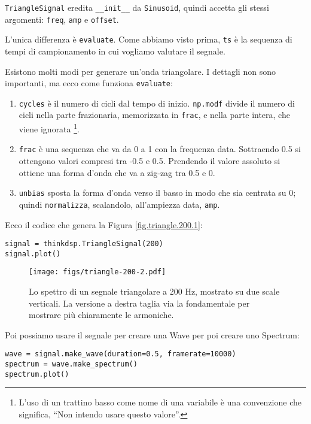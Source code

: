 \documentclass[12pt]{book} \usepackage[width=5.5in,height=8.5in, hmarginratio=3:2,vmarginratio=1:1]{geometry}
\begin{document}
{\tt TriangleSignal} eredita \verb"__init__" da {\tt Sinusoid}, quindi accetta gli stessi argomenti: {\tt freq}, {\tt amp} e {\tt offset}.

L'unica differenza è {\tt evaluate}. Come abbiamo visto prima, {\tt ts} è la sequenza di tempi di campionamento in cui vogliamo valutare il segnale.

Esistono molti modi per generare un'onda triangolare. I dettagli non sono importanti, ma ecco come funziona {\tt evaluate}:

\begin{enumerate} 

\item {\tt cycles} è il numero di cicli dal tempo di inizio. {\tt np.modf} divide il numero di cicli nella parte frazionaria, memorizzata in {\tt frac}, e nella parte intera, che viene ignorata \footnote{L'uso di un trattino basso come nome di una variabile è una convenzione che significa, ``Non intendo usare questo valore''.}.

\item {\tt frac} è una sequenza che va da 0 a 1 con la frequenza data. Sottraendo 0.5 si ottengono valori compresi tra -0.5 e 0.5. Prendendo il valore assoluto si ottiene una forma d'onda che va a zig-zag tra 0.5 e 0.

\item {\tt unbias} sposta la forma d'onda verso il basso in modo che sia centrata su 0; quindi {\tt normalizza}, scalandolo, all'ampiezza data, {\tt amp}.

\end{enumerate} 

Ecco il codice che genera la Figura \ref{fig.triangle.200.1}:

\begin{verbatim} 
signal = thinkdsp.TriangleSignal(200)
signal.plot()
 \end{verbatim} 

\begin{figure} 

\centerline{\texttt{[image: figs/triangle-200-2.pdf]}} \caption{Lo spettro di un segnale triangolare a 200 Hz, mostrato su due scale verticali. La versione a destra taglia via la fondamentale per mostrare più chiaramente le armoniche.} \label{fig.triangle.200.2} \end{figure} 

Poi possiamo usare il segnale per creare una Wave per poi creare uno Spectrum:

\begin{verbatim} 
wave = signal.make_wave(duration=0.5, framerate=10000)
spectrum = wave.make_spectrum()
spectrum.plot()
 \end{verbatim} 
\end{document}
